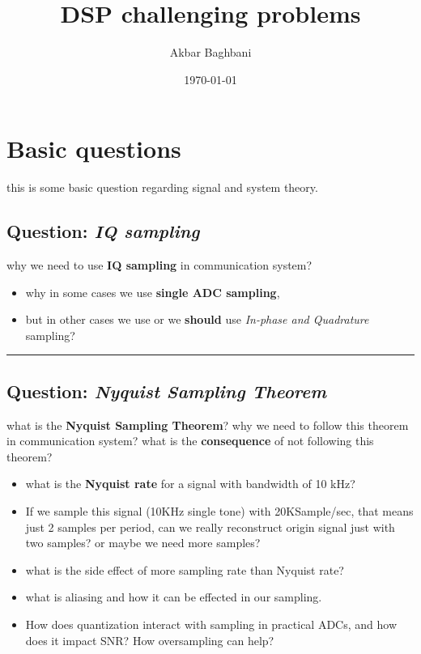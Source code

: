 \documentclass{article} %
\begin{document}
\title{DSP challenging problems}
\author{Akbar Baghbani}
\date{\today}
\maketitle

\tableofcontents
\newpage
{}
    
\section{Basic questions}
    this is some basic question regarding signal and system theory.
    
\subsection{Question: \textit{IQ sampling}}
    why we need to use \textbf{IQ sampling} in communication system? 
    \begin{itemize}
        \item why in some cases we use \textbf{single ADC sampling}, 
        \item but in other cases we use or we \textbf{should} use \emph{In-phase and Quadrature} sampling?
    \end{itemize}

\hrule
\bigskip
\subsection{Question: \textit{Nyquist Sampling Theorem}}
    what is the \textbf{Nyquist Sampling Theorem}? why we need to follow this theorem in communication system? what is the \textbf{consequence} of not following this theorem?
    \begin{itemize}
        \item what is the \textbf{Nyquist rate} for a signal with bandwidth of 10 kHz?
        \item If we sample this signal (10KHz single tone) with 20KSample/sec, that means just 2 samples per period, can we really reconstruct origin signal just with two samples? or maybe we need more samples?
        \item what is the side effect of more sampling rate than Nyquist rate?
        \item what is aliasing and how it can be effected in our sampling.
	\item How does quantization interact with sampling in practical ADCs, and how does it impact SNR? How oversampling can help?
    \end{itemize}
\end{document}
